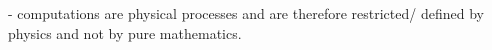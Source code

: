 - computations are physical processes and are therefore restricted/ defined by physics and not by pure mathematics.








